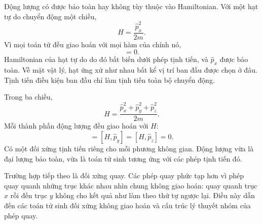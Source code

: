 Động lượng có được bảo toàn hay không tùy thuộc vào Hamiltonian. Với một hạt tự do chuyển động một chiều,
\begin{equation}
H=\frac{\hat p_x^2}{2m}.
\end{equation}
Vì mọi toán tử đều giao hoán với mọi hàm của chính nó,
\begin{equation}
[H,\hat p_x]=0.
\end{equation}
Hamiltonian của hạt tự do do đó bất biến dưới phép tịnh tiến, và \(\hat p_x\) được bảo toàn. Về mặt vật lý, hạt ứng xử như nhau bất kể vị trí ban đầu được chọn ở đâu. Tịnh tiến điều kiện ban đầu chỉ làm tịnh tiến toàn bộ chuyển động.

Trong ba chiều,
\begin{equation}
H
=
\frac{\hat p_x^2+\hat p_y^2+\hat p_z^2}{2m}.
\end{equation}
Mỗi thành phần động lượng đều giao hoán với \(H\):
\begin{equation}
[H,\hat p_x]=[H,\hat p_y]=[H,\hat p_z]=0.
\end{equation}
Có một đối xứng tịnh tiến riêng cho mỗi phương không gian. Động lượng vừa là đại lượng bảo toàn, vừa là toán tử sinh tương ứng với các phép tịnh tiến đó.

Trường hợp tiếp theo là đối xứng quay. Các phép quay phức tạp hơn vì phép quay quanh những trục khác nhau nhìn chung không giao hoán: quay quanh trục \(x\) rồi đến trục \(y\) không cho kết quả như làm theo thứ tự ngược lại. Điều này dẫn đến các toán tử sinh đối xứng không giao hoán và cấu trúc lý thuyết nhóm của phép quay.
